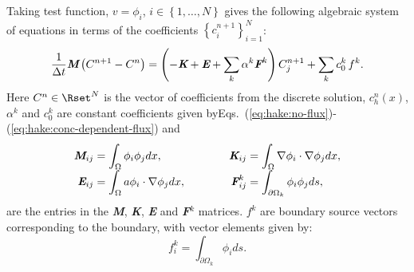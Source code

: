 Taking test function, $v=\phi_i$, $i\in\left\{1,\ldots,N\right\}$
gives the following algebraic system of equations in terms of the
coefficients $\left\{ c^{n+1}_i\right\}^N_{i=1}$:
\begin{equation}
  \label{eq:hake:algebraic-equation}
  \frac{1}{\Delta{}t}\text{\bfseries\itshape M}\left(C^{n+1}-C^n\right) =  \left(-\text{\bfseries\itshape K}+\text{\bfseries\itshape E}+\sum_k\alpha^k\text{\bfseries\itshape F}^k\right)C_j^{n+1}+\sum_k c_0^k\,f^k.
\end{equation}
Here $C^n\in \Rset^N$ is the vector of coefficients from the discrete
solution, $c^n_h(x)$, $\alpha^k$ and $c_0^k$ are constant coefficients
given byEqs.~(\ref{eq:hake:no-flux})-(\ref{eq:hake:conc-dependent-flux})
and\\[-1.0em]
\begin{equation}
  \renewcommand{\arraystretch}{1.7}
  \renewcommand{\baselinestretch}{1.7}
  \begin{array}{r@{\;=\;}lcr@{\;=\;}l}
    \text{\bfseries\itshape M}_{ij}&\displaystyle\int_\Omega\phi_i\phi_jdx,& \quad\quad&\text{\bfseries\itshape K}_{ij}&\displaystyle\int_\Omega\nabla\phi_i\cdot\nabla\phi_jdx,\\
    \text{\bfseries\itshape E}_{ij}&\displaystyle\int_\Omega a\phi_i\cdot\nabla\phi_jdx,& \quad\quad&\text{\bfseries\itshape F}^k_{ij}&\displaystyle\int_{\partial\Omega_k}\phi_i\phi_jds,
  \end{array}
  \renewcommand{\arraystretch}{1}
  \renewcommand{\baselinestretch}{1}
  \label{eq:hake:matrices}
\end{equation}
are the entries in the {\bfseries\itshape M}, {\bfseries\itshape K},
{\bfseries\itshape E} and {\bfseries\itshape F}$^k$ matrices. $f^k$
are boundary source vectors corresponding to the \kth boundary, with
vector elements given by:
\begin{equation}
  \label{eq:hake:vector}
  f^k_{i}=\int_{\partial\Omega_k}\phi_ids.
\end{equation}

